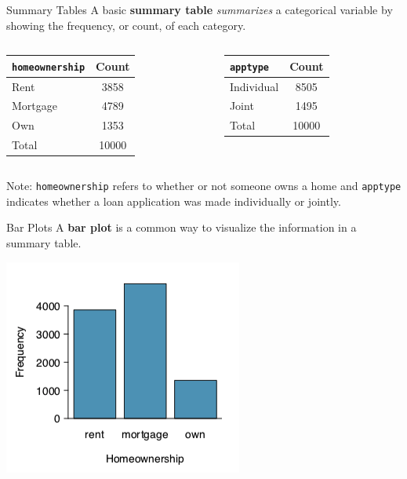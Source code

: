 \begin{frame}{Summary Tables}
    A basic \textbf{summary table} \textit{summarizes} a categorical variable by showing the frequency, or count, of each category.
    
    \begin{columns}[T] %
        \begin{column}{.48\textwidth}
        \begin{center}
        \begin{tabular}{l c}
		    \texttt{homeownership} & Count \\ \hline
		    Rent & 3858 \\ 
		    Mortgage & 4789 \\
		    Own & 1353 \\ \hline
		    Total & 10000 \\ \hline
        \end{tabular}
        \end{center}
        \end{column}%
        \hfill%
        \begin{column}{.48\textwidth}
        \begin{center}
        \begin{tabular}{l c}
		    \texttt{apptype} & Count \\ \hline
		    Individual & 8505 \\ 
		    Joint & 1495 \\ \hline
		    Total & 10000 \\ \hline
        \end{tabular}
        \end{center}
        \end{column}%
    \end{columns}
    \vspace{12pt}Note: \texttt{homeownership} refers to whether or not someone owns a home and \texttt{apptype} indicates whether a loan application was made individually or jointly.
\end{frame}

\begin{frame}{Bar Plots}
    A \textbf{bar plot} is a common way to visualize the information in a summary table. 
    \begin{center}
        \includegraphics[scale=0.5]{images/barplot_freq.png}
    \end{center}
\end{frame}

